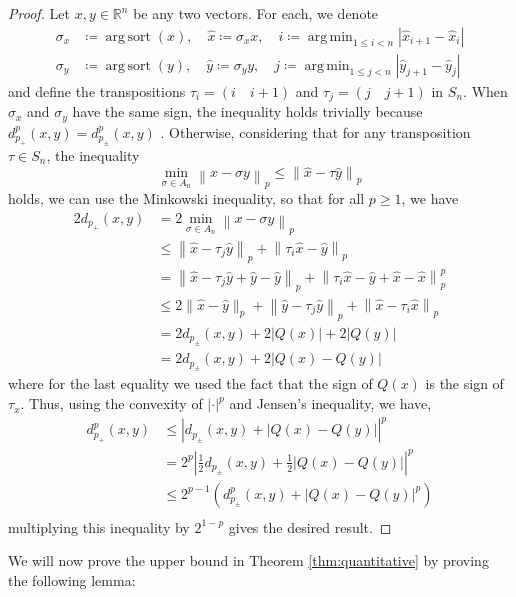 \documentclass{amsart}
\theoremstyle{plain}
\theoremstyle{definition}
\theoremstyle{remark}
\DeclareMathOperator*{\argmin}{arg\,min}
\DeclareMathOperator*{\argsort}{arg\,sort}
\newcommand{\RR}{\mathbb{R}}
\newcommand{\abs}[1]{\left\lvert#1\right\rvert}
\begin{document}
\begin{proof}
    Let $x, y \in \RR^n$ be any two vectors. For each, we denote 
        \begin{equation} \begin{split}
        \sigma_x &\coloneq \argsort{\left(x \right)}, \quad \hat{x} \coloneq \sigma_x x, \quad i \coloneq \argmin_{1 \leq i < n}{\abs{\hat{x}_{i+1} - \hat{x}_{i}}} \\
        \sigma_y &\coloneq \argsort{\left(y \right)}, \quad \hat{y} \coloneq \sigma_y y,  \quad j \coloneq \argmin_{1 \leq j < n}{\abs{\hat{y}_{j+1} - \hat{y}_{j}}}
    \end{split} \end{equation}
and define the transpositions $\tau_i = (i \quad i+1)$ and $\tau_j = (j \quad j+1)$ in $S_n$. 
When $\sigma_x$ and $\sigma_y$ have the same sign, the inequality holds trivially because $d^p_{p_+}(x, y)=d^p_{p_\pm}(x, y) $ . Otherwise, considering that for any transposition $\tau \in S_n$, the inequality
\begin{equation}
    \min_{\sigma \in A_n}{\left\| x - \sigma y\right\|_p} \leq \left\| \hat{x} - \tau \hat{y}\right\|_p 
\end{equation}
holds, we can use the Minkowski inequality, so that for all $p \geq 1$, we have
\begin{equation}
    \begin{split}
        2d_{p_+}(x, y) &= 
2 \min_{\sigma \in A_n}{\left\| x - \sigma y\right\|_p}   \\
&\leq \left\| \hat{x} - \tau_j\hat{y}\right\|_p + \left\| \tau_i\hat{x} - \hat{y} \right\|_p \\
&= \left\| \hat{x} - \tau_j\hat{y} + \hat{y} - \hat{y}\right\|_p + \left\| \tau_i\hat{x} - \hat{y} + \hat{x} - \hat{x}\right\|_p^p  \\
&\leq 2\|\hat x-\hat y\|_p + \left\|\hat{y} - \tau_j\hat{y} \right\|_p + \left\|\hat{x} - \tau_i\hat{x} \right\|_p  \\
&= 2d_{p_{\pm}}(x, y) + 2\abs{Q(x)} + 2\abs{Q(y)}\\
&=2d_{p_{\pm}}(x, y) + 2\abs{Q(x)-Q(y)}
    \end{split}
\end{equation}
where for the last equality we used the fact that the sign of $Q(x)$ is the sign of $\tau_x$. Thus, using the convexity of $\abs{\cdot}^p$ and Jensen's inequality, we have,
\begin{equation}
    \begin{split}
        d_{p_+}^p(x, y) &\leq \abs{d_{p_{\pm}}(x, y) + \abs{Q(x)- Q(y)}}^p \\
        & = 2^p \abs{\frac{1}{2}d_{p_{\pm}}(x, y) + \frac{1}{2}\abs{Q(x)-  Q(y)}}^p  \\
        &\leq 2^{p-1}\left(d^p_{p_{\pm}}(x, y) + \abs{Q(x)-Q(y)}^p \right) \\
    \end{split}
\end{equation}
multiplying this inequality by $2^{1-p}$ gives the desired result.
\end{proof}
We will now prove the upper bound in Theorem \ref{thm:quantitative} by proving the following lemma:
\end{document}
